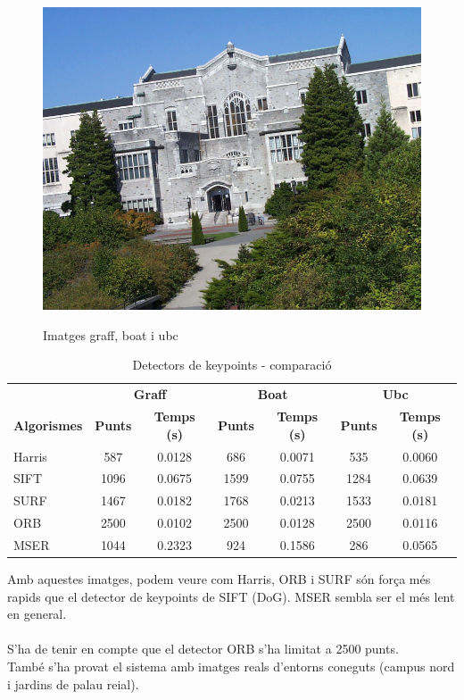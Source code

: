 \begin{figure}[!htb]
				\includegraphics[width=\linewidth]{images/experiments/ubc}
				\label{fig:awesome_image3}
			\endminipage
			\caption{Imatges graff, boat i ubc}
		\end{figure}

		\begin{table}[H]
			\begin{center}
				\begin{tabular}{l | c c | c c | c c}
					& \multicolumn{2}{c|}{\textbf{Graff}} & \multicolumn{2}{c|}{\textbf{Boat}} & \multicolumn{2}{c}{\textbf{Ubc}} \\
					\textbf{Algorismes} & \textbf{Punts} & \textbf{Temps (s)} & \textbf{Punts} & \textbf{Temps (s)} & \textbf{Punts} & \textbf{Temps (s)} \\ \hline
					Harris & 587 & 0.0128 & 686 & 0.0071 & 535 & 0.0060 \\
					SIFT & 1096 & 0.0675 & 1599 & 0.0755 & 1284 & 0.0639 \\
					SURF & 1467 & 0.0182 & 1768 & 0.0213 & 1533 & 0.0181 \\
					ORB & 2500 & 0.0102 & 2500 & 0.0128 & 2500 & 0.0116 \\
					MSER & 1044 & 0.2323 & 924 & 0.1586 & 286 & 0.0565 \\
				\end{tabular}
			\end{center}
			\caption{Detectors de keypoints - comparació}
		\end{table}
		\noindent
		Amb aquestes imatges, podem veure com Harris, ORB i SURF són força més rapids que el detector de keypoints de SIFT (DoG). MSER sembla ser el més lent en general.\\\\
		S'ha de tenir en compte que el detector ORB s'ha limitat a 2500 punts.\\
\newpage
		\noindent
		També s'ha provat el sistema amb imatges reals d'entorns coneguts (campus nord i jardins de palau reial).

